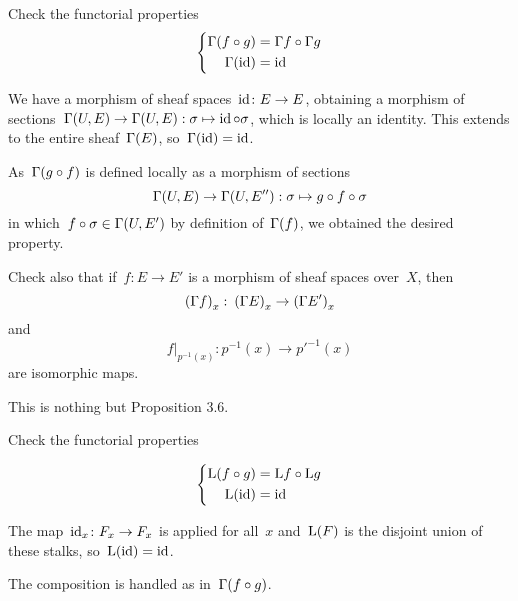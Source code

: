 \documentclass[a4paper,11pt,oneside,openany,article]{memoir}
\begin{document}
\begin{exercise}[3.7]
  Check the functorial properties
  \begin{equation}
    \left\{
      \begin{aligned}
        \mathrm{\Gamma}(f\circ g)&=\mathrm{\Gamma} f\circ\mathrm{\Gamma} g \\
        \mathrm{\Gamma}(\operatorname{id})&=\operatorname{id}
      \end{aligned}
    \right.
  \end{equation}

  \begin{solution}
    We have a morphism of sheaf spaces~$\operatorname{id}\colon E\to E$, obtaining a morphism of sections~$\mathrm{\Gamma}(U,E)\to\mathrm{\Gamma}(U,E):\sigma\mapsto\operatorname{id}\circ\sigma$, which is locally an identity. This extends to the entire sheaf~$\mathrm{\Gamma}(E)$, so~$\mathrm{\Gamma}(\operatorname{id})=\operatorname{id}$.

    As~$\mathrm{\Gamma}(g\circ f)$ is defined locally as a morphism of sections
    \begin{equation}
      \mathrm{\Gamma}(U,E)\to\mathrm{\Gamma}(U,E''):\sigma\mapsto g\circ f\circ\sigma
    \end{equation}
    in which~$f\circ\sigma\in\mathrm{\Gamma}(U,E')$ by definition of~$\mathrm{\Gamma}(f)$, we obtained the desired property.
  \end{solution}

  Check also that if~$f\colon E\to E'$ is a morphism of sheaf spaces over~$X$, then
  \begin{equation}
    \left( \mathrm{\Gamma} f \right)_x\colon\left( \mathrm{\Gamma} E \right)_x\to\left( \mathrm{\Gamma} E' \right)_x
  \end{equation}
  and
  \begin{equation}
    f|_{p^{-1}(x)}\colon p^{-1}(x)\to p'^{-1}(x)
  \end{equation}
  are isomorphic maps.

  \begin{solution}
    This is nothing but Proposition 3.6.
  \end{solution}
\end{exercise}

\begin{exercise}[3.9]
  Check the functorial properties

  \begin{equation}
    \left\{
      \begin{aligned}
        \mathrm{L}(f\circ g)&=\mathrm{L} f\circ\mathrm{L} g \\
        \mathrm{L}(\operatorname{id})&=\operatorname{id}
      \end{aligned}
    \right.
  \end{equation}

  \begin{solution}
    The map~$\operatorname{id}_x\colon F_x\to F_x$ is applied for all~$x$ and~$\mathrm{L}(F)$ is the disjoint union of these stalks, so~$\mathrm{L}(\operatorname{id})=\operatorname{id}$.

    The composition is handled as in~$\mathrm{\Gamma}(f\circ g)$.
  \end{solution}
\end{exercise}
\end{document}
